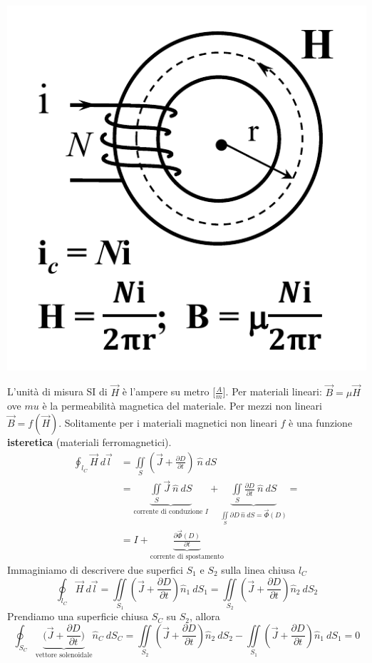 \documentclass{article}
\begin{document}
\begin{center}
    \includegraphics[scale=0.3]{Image/Campo magnetico-2.png}
\end{center}
L'unità di misura SI di $\vec H$ è l'ampere su metro [$\frac{A}{m}$].
Per materiali lineari: $\vec B = \mu \vec H$ ove $mu$ è la permeabilità magnetica del materiale. Per mezzi non lineari
$\vec B = f(\vec H)$. Solitamente per i materiali magnetici non lineari $f$ è una funzione \textbf{isteretica} (materiali
ferromagnetici).
\begin{align*}
    \oint_{l_C}\vec H \ d \vec l &= \iint\limits_{S} \left( \vec J + \frac{\partial
    D}{\partial t} \right) \ \hat n \ dS\\
    &= \underbrace{\iint\limits_{S} \vec J \ \hat n \ dS}_{\text{corrente di conduzione } I} + \underbrace{\iint\limits_{S} \frac{\partial D}{\partial t} \ \hat n \ dS}_{\iint\limits_{S} \partial D \ \hat n \ dS =\vec \Phi(D)} =\\
    &= I + \underbrace{\frac{\partial \vec \Phi(D)}{\partial t}}_{\text{corrente di spostamento}}
\end{align*}
Immaginiamo di descrivere due superfici $S_1$ e $S_2$ sulla linea chiusa $l_C$
\[
    \oint_{l_C} \vec H \ d\vec l = \iint\limits_{S_1}\left( \vec J + \frac{\partial D}{\partial t} \right) \hat n_1 \ dS_1 = \iint\limits_{S_2}\left( \vec J + \frac{\partial D}{\partial t} \right) \hat n_2 \ dS_2
\]
Prendiamo una superficie chiusa $S_C$ su $S_2$, allora
\[
    \oint_{S_C}\underbrace{\bigg( \vec J + \frac{\partial D}{\partial t}\bigg)}_{\text{vettore solenoidale}}\hat n_C \ dS_C = \iint\limits_{S_2}\left( \vec J + \frac{\partial D}{\partial t} \right) \hat n_2 \ dS_2 - \iint\limits_{S_1}\left( \vec J + \frac{\partial D}{\partial t} \right) \hat n_1 \ dS_1 = 0
\]
\end{document}
